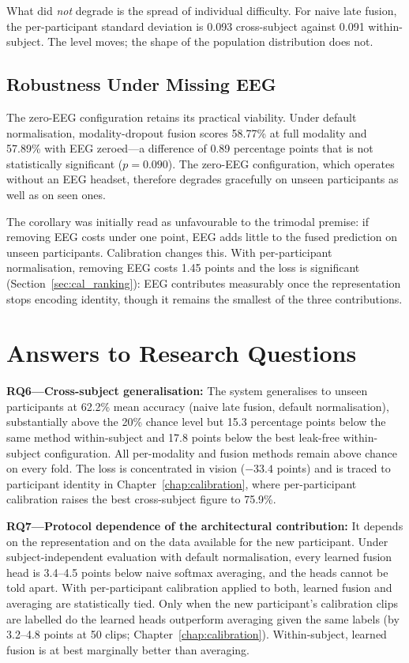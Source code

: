 What did \emph{not} degrade is the spread of individual difficulty. For naive late
fusion, the per-participant standard deviation is 0.093 cross-subject against 0.091
within-subject. The level moves; the shape of the population distribution does not.

\subsection{Robustness Under Missing EEG}

The zero-EEG configuration retains its practical viability. Under default
normalisation, modality-dropout fusion scores 58.77\% at full modality and 57.89\% with
EEG zeroed---a difference of 0.89 percentage points that is not statistically
significant ($p = 0.090$). The zero-EEG configuration, which operates without an EEG
headset, therefore degrades gracefully on unseen participants as well as on seen ones.

The corollary was initially read as unfavourable to the trimodal premise: if removing
EEG costs under one point, EEG adds little to the fused prediction on unseen
participants. Calibration changes this. With per-participant normalisation, removing
EEG costs 1.45 points and the loss is significant (Section~\ref{sec:cal_ranking}): EEG
contributes measurably once the representation stops encoding identity, though it
remains the smallest of the three contributions.

\section{Answers to Research Questions}
\label{sec:cs_rq}

\textbf{RQ6---Cross-subject generalisation:} The system generalises to unseen
participants at 62.2\% mean accuracy (naive late fusion, default normalisation),
substantially above the 20\% chance level but 15.3 percentage points below the same
method within-subject and 17.8 points below the best leak-free within-subject
configuration. All per-modality and fusion methods remain above chance on every fold.
The loss is concentrated in vision ($-33.4$ points) and is traced to participant
identity in Chapter~\ref{chap:calibration}, where per-participant calibration raises
the best cross-subject figure to 75.9\%.

\textbf{RQ7---Protocol dependence of the architectural contribution:} It depends on
the representation and on the data available for the new participant. Under
subject-independent evaluation with default normalisation, every learned fusion head
is 3.4--4.5 points below naive softmax averaging, and the heads cannot be told apart.
With per-participant calibration applied to both, learned fusion and averaging are
statistically tied. Only when the new participant's calibration clips are labelled do
the learned heads outperform averaging given the same labels (by 3.2--4.8 points at 50
clips; Chapter~\ref{chap:calibration}). Within-subject, learned fusion is at best
marginally better than averaging.